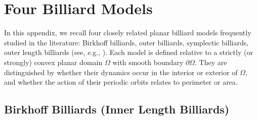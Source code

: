 \documentclass[10pt]{article}
\begin{document}
\newpage
\appendix


\section{Four Billiard Models}
\label{sec:four_billiards}

In this appendix, we recall four closely related planar billiard models frequently studied in the literature:
Birkhoff billiards, outer billiards, symplectic billiards, outer length billiards
(see, e.g., \cite{BBS}). 
Each model is defined relative to a strictly (or strongly) convex planar domain $\Omega$ with smooth boundary $\partial\Omega$. They are distinguished by whether their dynamics occur in the interior or exterior of $\Omega$, and whether the action of their periodic orbits relates to perimeter or area.

\subsection{Birkhoff Billiards (Inner Length Billiards)}
\end{document}
